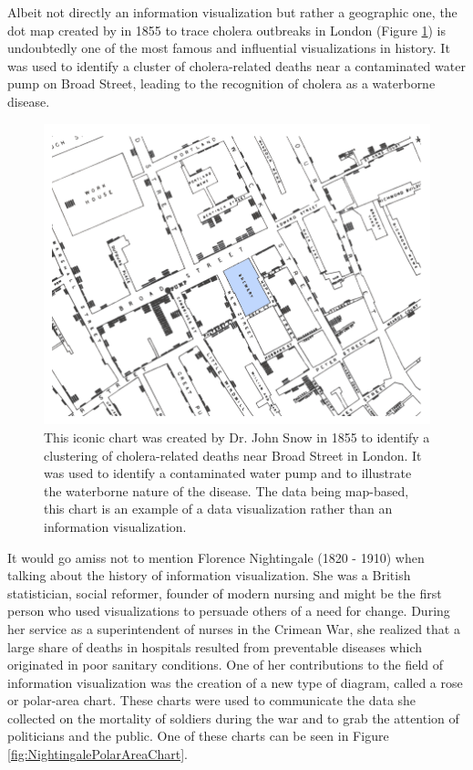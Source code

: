 Albeit not directly an information visualization but rather a geographic one, the dot map created by \cite{ModeOfCommunicationOfCholera} in 1855 to trace cholera outbreaks in London (Figure \ref{fig:CholeraDotMap}) is undoubtedly one of the most famous and influential visualizations in history.
It was used to identify a cluster of cholera-related deaths near a contaminated water pump on Broad Street, leading to the recognition of cholera as a waterborne disease.

\begin{figure}[tp]
\centering
\includegraphics[keepaspectratio,width=\linewidth,height=\fullh / 3]{images/cholera-dot-map.png}
\caption[Dot Map Plotting Cholera Deaths in London From 1855]{
  This iconic chart was created by Dr. John Snow in 1855 to identify a clustering of cholera-related deaths near Broad Street in London.
  It was used to identify a contaminated water pump and to illustrate the waterborne nature of the disease.
  The data being map-based, this chart is an example of a data visualization rather than an information visualization.
}
\label{fig:CholeraDotMap}
\end{figure}

It would go amiss not to mention Florence Nightingale (1820 - 1910) \parencite{FlorenceNightingale} when talking about the history of information visualization.
She was a British statistician, social reformer, founder of modern nursing and might be the first person who used visualizations to persuade others of a need for change.
During her service as a superintendent of nurses in the Crimean War, she realized that a large share of deaths in hospitals resulted from preventable diseases which originated in poor sanitary conditions.
One of her contributions to the field of information visualization was the creation of a new type of diagram, called a rose or polar-area chart.
These charts were used to communicate the data she collected on the mortality of soldiers during the war and to grab the attention of politicians and the public.
One of these charts can be seen in Figure \ref{fig:NightingalePolarAreaChart}.

